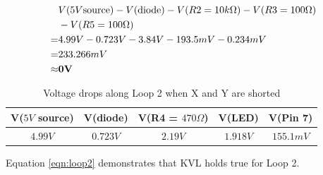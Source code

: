 \documentclass[12pt]{article}
\begin{document}
\begin{enumerate}[a)]
        \begin{equation}
            \label{eqn:loop1}
            \begin{split}
                & V(5V \textnormal{source}) - V(\textnormal{diode}) - V(R2 = 10k\Omega) - V(R3 = 100\Omega) \\ & - V(R5 = 100\Omega)  \\
                = & 4.99V - 0.723V - 3.84V - 193.5mV - 0.234mV \\
                = & 233.266mV \\
                \approx & \textbf{0V}
            \end{split}
        \end{equation}

        \begin{table}[ht]
            \caption{Voltage drops along Loop 2 when X and Y are shorted}
            \label{tbl:loop2}
            \centering
            \begin{tabular}{| c | c | c | c | c |}
                \hline
                V($5V$ source) & V(diode) & V(R4 = $470\Omega$) & V(LED) & V(Pin 7) \\
                \hline
                $4.99V$ & $0.723V$ & $2.19V$ & $1.918V$ & $155.1mV$ \\
                \hline 
            \end{tabular}
        \end{table}

        Equation \ref{eqn:loop2} demonstrates that KVL holds true for Loop 2.


\end{enumerate}
\end{document}

